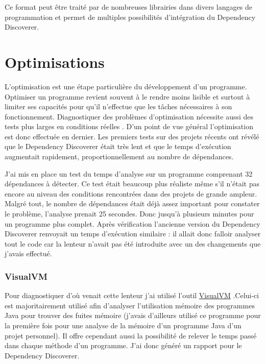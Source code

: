 \documentclass[french,a4paper,12pt]{report}
\begin{document}
Ce format peut être traité par de nombreuses librairies dans divers langages de programmation et permet de multiples possibilités d'intégration du Dependency Discoverer.


\section{Optimisations}

L’optimisation est une étape particulière du développement d’un programme. Optimiser un programme revient souvent à le rendre moins lisible et surtout à limiter ses capacités pour qu’il n’effectue que les tâches nécessaires à son fonctionnement. Diagnostiquer des problèmes d’optimisation nécessite aussi des tests plus larges en conditions réelles . D’un point de vue général l'optimisation est donc effectuée en dernier. 
Les premiers tests sur des projets récents ont révélé que le Dependency Discoverer était très lent et que le temps d’exécution augmentait rapidement, proportionnellement au nombre de dépendances. 

J’ai mis en place un test du temps d’analyse sur un programme comprenant 32 dépendances à détecter. Ce test était beaucoup plus réaliste même s'il n'était pas encore au niveau des conditions rencontrées dans des projets de grande ampleur. Malgré tout, le nombre de dépendances était déjà assez important pour constater le problème, l’analyse prenait 25 secondes. Donc jusqu’à plusieurs minutes pour un programme plus complet. Après vérification l’ancienne version du Dependency Discoverer renvoyait un temps d’exécution similaire : il allait donc falloir analyser tout le code car la lenteur n'avait pas été introduite avec un des changements que j'avais effectué.

\subsubsection{VisualVM}

Pour diagnostiquer d’où venait cette lenteur j’ai utilisé l’outil \href{https://visualvm.github.io/}{VisualVM} .Celui-ci est majoritairement utilisé afin d’analyser l’utilisation mémoire des programmes Java pour trouver des fuites mémoire (j’avais d’ailleurs utilisé ce programme pour la première fois pour une analyse de la mémoire d’un programme Java d'un projet personnel). Il offre cependant aussi la possibilité de relever le temps passé dans chaque méthode d’un programme. J’ai donc généré un rapport pour le Dependency Discoverer.
\end{document}
